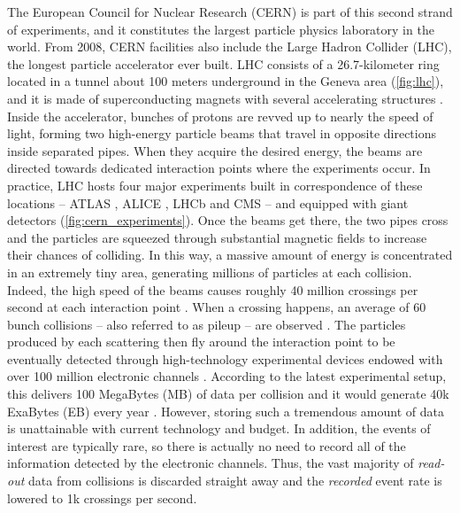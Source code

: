 The European Council for Nuclear Research (CERN) is part of this second strand of experiments, and it constitutes the largest particle physics laboratory in the world.
From 2008, CERN facilities also include the Large Hadron Collider (LHC), the longest particle accelerator ever built.
LHC consists of a \mbox{26.7-kilometer} ring located in a tunnel about 100 meters underground in the Geneva area (\cref{fig:lhc}), and it is made of superconducting magnets with several accelerating structures \cite{lhcwebsite}.
Inside the accelerator, bunches of protons are revved up to nearly the speed of light, forming two high-energy particle beams that travel in opposite directions inside separated pipes. 
When they acquire the desired energy, the beams are directed towards dedicated interaction points where the experiments occur. %
In practice, LHC hosts four major experiments built in correspondence of these locations -- ATLAS \cite{aad2008atlas}, ALICE \cite{aamodt2008alice}, LHCb \cite{alves2008lhcb} and CMS \cite{collaboration2008cms} -- and equipped with giant detectors (\cref{fig:cern_experiments}).
Once the beams get there, the two pipes cross and the particles are squeezed through substantial magnetic fields to increase their chances of colliding. 
In this way, a massive amount of energy is concentrated in an extremely tiny area, generating millions of particles at each collision.
Indeed, the high speed of the beams causes roughly 40 million crossings per second at each interaction point \cite{albrecht2019roadmap, grandi2017HEPsize}. 
When a crossing happens, an average of 60 bunch collisions -- also referred to as pileup -- are observed \cite{albrecht2019roadmap}. The particles produced by each scattering then fly around the interaction point to be eventually detected through high-technology experimental devices endowed with over 100 million electronic channels \cite{grandi2017HEPsize, aad2020channels}.
According to the latest experimental setup, this delivers 100 MegaBytes (MB) of data per collision and it would generate 40k ExaBytes (EB) every year \cite{grandi2017HEPsize}.
However, storing such a tremendous amount of data is unattainable with current technology and budget. In addition, the events of interest are typically rare, so there is actually no need to record all of the information detected by the electronic channels.
Thus, the vast majority of \emph{read-out} data from collisions is discarded straight away and the \emph{recorded} event rate is lowered to 1k crossings per second. 
